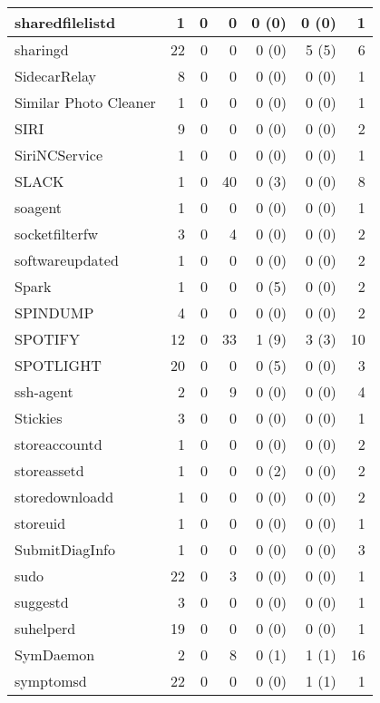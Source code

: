 \begin{adjustwidth}{-2in}{}
\begin{scriptsize}
\begin{longtable}[l]{ l | r | r | r | r | r | r }
    sharedfilelistd &  1 &  0 &  0 &  0 (0) &  0 (0) &  1 \\ \hline
    sharingd &  22 &  0 &  0 &  0 (0) &  5 (5) &  6 \\ \hline
    SidecarRelay & 8 &  0 &  0 &  0 (0) &  0 (0) &  1 \\ \hline
    Similar Photo Cleaner &  1 &  0 &  0 &  0 (0) &  0 (0) &  1 \\ \hline
    SIRI & 9 &  0 &  0 &  0 (0) &  0 (0) &  2 \\ \hline
    SiriNCService &  1 &  0 &  0 &  0 (0) &  0 (0) &  1 \\ \hline
    SLACK &  1 &  0 & 40 &  0 (3) &  0 (0) &  8 \\ \hline
    soagent &  1 &  0 &  0 &  0 (0) &  0 (0) &  1 \\ \hline
    socketfilterfw & 3 &  0 &  4 &  0 (0) &  0 (0) &  2 \\ \hline
    softwareupdated &  1 &  0 &  0 &  0 (0) &  0 (0) &  2 \\ \hline
    Spark &  1 &  0 &  0 &  0 (5) &  0 (0) &  2 \\ \hline
    SPINDUMP & 4 &  0 &  0 &  0 (0) &  0 (0) &  2 \\ \hline
    SPOTIFY & 12 &  0 & 33 &  1 (9) &  3 (3) & 10 \\ \hline
    SPOTLIGHT & 20 &  0 &  0 &  0 (5) &  0 (0) &  3 \\ \hline
    ssh-agent &  2 &  0 &  9 &  0 (0) &  0 (0) &  4 \\ \hline
    Stickies & 3 &  0 &  0 &  0 (0) &  0 (0) &  1 \\ \hline
    storeaccountd &  1 &  0 &  0 &  0 (0) &  0 (0) &  2 \\ \hline
    storeassetd &  1 &  0 &  0 &  0 (2) &  0 (0) &  2 \\ \hline
    storedownloadd & 1 &  0 &  0 &  0 (0) &  0 (0) &  2 \\ \hline
    storeuid & 1 &  0 &  0 &  0 (0) &  0 (0) &  1 \\ \hline
    SubmitDiagInfo & 1 &  0 &  0 &  0 (0) &  0 (0) &  3 \\ \hline
    sudo &  22 &  0 &  3 &  0 (0) &  0 (0) &  1 \\ \hline
    suggestd & 3 &  0 &  0 &  0 (0) &  0 (0) &  1 \\ \hline
    suhelperd & 19 &  0 &  0 &  0 (0) &  0 (0) &  1 \\ \hline
    SymDaemon &  2 &  0 &  8 &  0 (1) &  1 (1) & 16 \\ \hline
    symptomsd & 22 &  0 &  0 &  0 (0) &  1 (1) &  1 \\ \hline

\end{longtable}
\end{scriptsize}
\end{adjustwidth}
